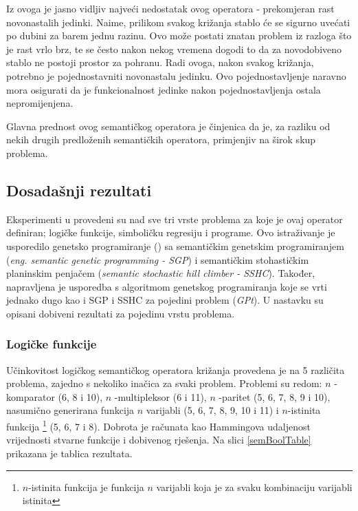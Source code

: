 Iz ovoga je jasno vidljiv najveći nedostatak ovog operatora - prekomjeran rast novonastalih jedinki. Naime, prilikom svakog križanja stablo će se sigurno uvećati po dubini za barem jednu razinu. Ovo može postati znatan problem iz razloga što je rast vrlo brz, te se često nakon nekog vremena dogodi to da za novodobiveno stablo ne postoji prostor za pohranu. Radi ovoga, nakon svakog križanja, potrebno je pojednostavniti novonastalu jedinku. Ovo pojednostavljenje naravno mora osigurati da je funkcionalnost jedinke nakon pojednostavljenja ostala nepromijenjena.

Glavna prednost ovog semantičkog operatora je činjenica da je, za razliku od nekih drugih predloženih semantičkih operatora, primjenjiv na širok skup problema.

\subsection{Dosadašnji rezultati}

Eksperimenti u \cite{crxSem} provedeni su nad sve tri vrste problema za koje je ovaj operator definiran; logičke funkcije, simboličku regresiju i programe. Ovo istraživanje je usporedilo genetsko programiranje () sa semantičkim genetskim programiranjem (\textit{eng. semantic genetic programming - SGP}) i semantičkim stohastičkim planinskim penjačem (\textit{semantic stochastic hill climber - SSHC}). Također, napravljena je usporedba s algoritmom genetskog programiranja koje se vrti jednako dugo kao i SGP i SSHC za pojedini problem (\textit{GPt}). U nastavku su opisani dobiveni rezultati za pojedinu vrstu problema.

\subsubsection{Logičke funkcije}

Učinkovitost logičkog semantičkog operatora križanja provedena je na 5 različita problema, zajedno s nekoliko inačica za svaki problem. Problemi su redom: $n$ -komparator (6, 8 i 10), $n$ -multipleksor (6 i 11), $n$ -paritet (5, 6, 7, 8, 9 i 10), nasumično generirana funkcija $n$ varijabli (5, 6, 7, 8, 9, 10 i 11) i $n$-istinita funkcija \footnote{$n$-istinita funkcija je funkcija $n$ varijabli koja je za svaku kombinaciju varijabli istinita} (5, 6, 7 i 8). Dobrota je računata kao Hammingova udaljenost vrijednosti stvarne funkcije i dobivenog rješenja. Na slici \ref{semBoolTable} prikazana je tablica rezultata. 

